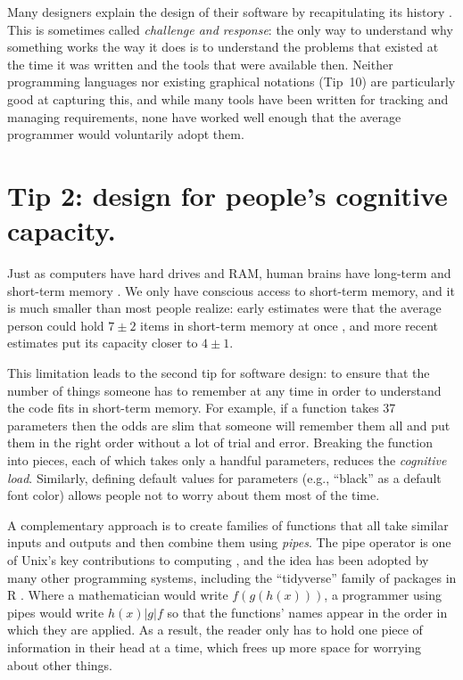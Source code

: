 \documentclass[10pt,letterpaper]{article}
\begin{document}
\begin{mdframed}
  \noindent
  Many designers explain the design of their software
  by recapitulating its history \cite{Brown2011,Brown2012}.
  This is sometimes called \emph{challenge and response}:
  the only way to understand why something works the way it does
  is to understand the problems that existed at the time it was written
  and the tools that were available then.
  Neither programming languages nor existing graphical notations (Tip~10)
  are particularly good at capturing this,
  and while many tools have been written for tracking and managing requirements,
  none have worked well enough that the average programmer would voluntarily adopt them.
\end{mdframed}

\section*{Tip 2: design for people's cognitive capacity.}

Just as computers have hard drives and RAM,
human brains have long-term and short-term memory \cite{Hermans2021}.
We only have conscious access to short-term memory,
and it is much smaller than most people realize:
early estimates were that the average person could hold
$7{\pm}2$ items in short-term memory at once \cite{Miller1956},
and more recent estimates put its capacity closer to $4{\pm}1$.

This limitation leads to the second tip for software design:
to ensure that the number of things someone has to remember at any time
in order to understand the code
fits in short-term memory.
For example,
if a function takes 37 parameters
then the odds are slim
that someone will remember them all and put them in the right order
without a lot of trial and error.
Breaking the function into pieces,
each of which takes only a handful parameters,
reduces the \emph{cognitive load}.
Similarly,
defining default values for parameters
(e.g., ``black'' as a default font color)
allows people not to worry about them most of the time.

A complementary approach is to create families of functions
that all take similar inputs and outputs
and then combine them using \emph{pipes}.
The pipe operator is one of Unix's key contributions to computing \cite{Kernighan2019},
and the idea has been adopted by many other programming systems,
including the ``tidyverse'' family of packages in R \cite{Wickham2017}.
Where a mathematician would write $f(g(h(x)))$,
a programmer using pipes would write $h(x) | g | f$
so that the functions' names appear in the order in which they are applied.
As a result,
the reader only has to hold one piece of information in their head at a time,
which frees up more space for worrying about other things.
\end{document}
